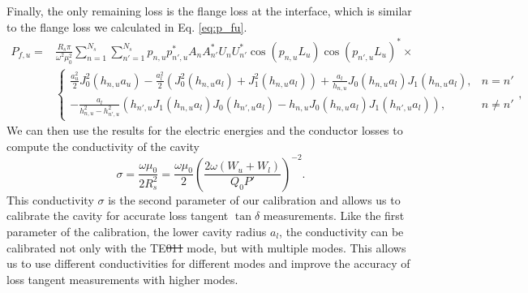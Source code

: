 Finally, the only remaining loss is the flange loss at the interface, which is similar to the flange loss we calculated in Eq. \eqref{eq:p_fu}.
\begin{align}
P_{f,u}=& \frac{R_s\pi}{\omega^2\mu_0^2}\sum\limits_{n=1}^{N_s}\sum\limits_{n'=1}^{N_s}p_{n,u}p_{n',u}^*A_nA_{n'}^*U_nU_{n'}^*\cos(p_{n,u}L_u)\cos(p_{n',u}L_u)^*\times\\
 &\begin{cases}
 \frac{a_u^2}{2}J_0^2(h_{n,u}a_u)-\frac{a_l^2}{2}(J_0^2(h_{n,u}a_l)+J_1^2(h_{n,u}a_l))+\frac{a_l}{h_{n,u}}J_0(h_{n,u}a_l)J_1(h_{n,u}a_l),& n=n'\\
 -\frac{a_l}{h_{n,u}^2-h_{n',u}^2}(h_{n',u}J_1(h_{n,u}a_l)J_0(h_{n',u}a_l)-h_{n,u}J_0(h_{n,u}a_l)J_1(h_{n',u}a_l)),& n\neq n'
 \end{cases}\text{,}\nonumber
\end{align}
We can then use the results for the electric energies and the conductor losses to compute the conductivity of the cavity
\begin{equation}
\sigma = \frac{\omega\mu_0}{2R_s^2}=\frac{\omega\mu_0}{2}\left(\frac{2\omega(W_u+W_l)}{Q_0P'}\right)^{-2}\text{.}
\end{equation}
This conductivity $\sigma$ is the second parameter of our calibration and allows us to calibrate the cavity for accurate loss tangent $\tan\delta$ measurements. Like the first parameter of the calibration, the lower cavity radius $a_l$, the conductivity can be calibrated not only with the TE\st{011} mode, but with multiple modes. This allows us to use different conductivities for different modes and improve the accuracy of loss tangent measurements with higher modes.
